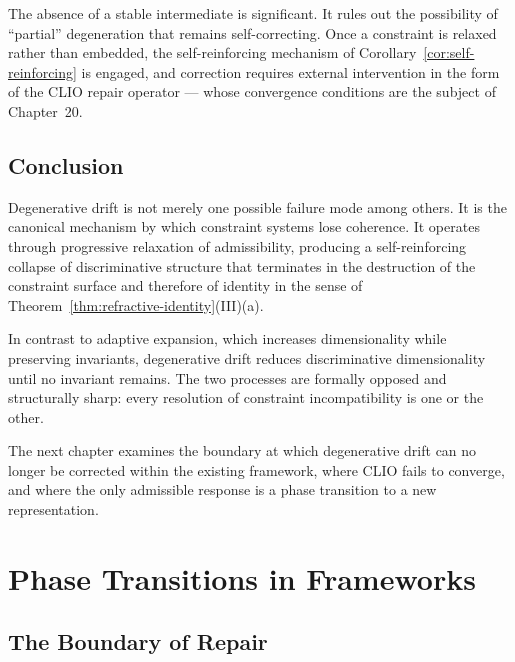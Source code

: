 \documentclass[11pt,openany]{book}
\begin{document}
\begin{remark}
The absence of a stable intermediate is significant.
It rules out the possibility of ``partial'' degeneration
that remains self-correcting.  Once a constraint is
relaxed rather than embedded, the self-reinforcing
mechanism of Corollary~\ref{cor:self-reinforcing} is
engaged, and correction requires external intervention in
the form of the CLIO repair operator --- whose convergence
conditions are the subject of Chapter~20.
\end{remark}

\section{Conclusion}
\label{sec:conclusion-drift}

Degenerative drift is not merely one possible failure mode
among others.  It is the canonical mechanism by which
constraint systems lose coherence.  It operates through
progressive relaxation of admissibility, producing a
self-reinforcing collapse of discriminative structure that
terminates in the destruction of the constraint surface and
therefore of identity in the sense of
Theorem~\ref{thm:refractive-identity}(III)(a).

In contrast to adaptive expansion, which increases
dimensionality while preserving invariants, degenerative
drift reduces discriminative dimensionality until no
invariant remains.  The two processes are formally opposed
and structurally sharp: every resolution of constraint
incompatibility is one or the other.

The next chapter examines the boundary at which degenerative
drift can no longer be corrected within the existing
framework, where CLIO fails to converge, and where the only
admissible response is a phase transition to a new
representation.


\chapter{Phase Transitions in Frameworks}
\label{ch:phase-transitions}

\section*{ The Boundary of Repair}
\end{document}
